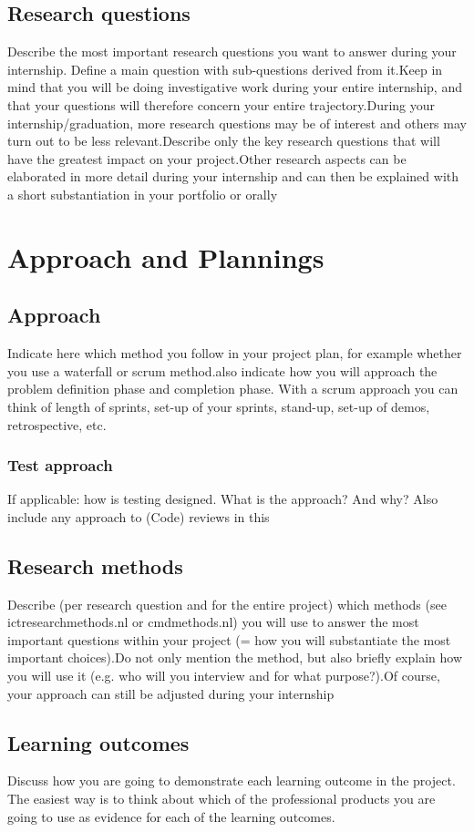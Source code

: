 \documentclass[a4paper, 11pt]{article}
\begin{document}
\subsection{Research questions}
Describe the most important research questions you want to answer during your internship. Define a main question with sub-questions derived from it.Keep in mind that you will be doing investigative work during your entire internship, and that your questions will therefore concern your entire trajectory.During your internship/graduation, more research questions may be of interest and others may turn out to be less relevant.Describe only the key research questions that will have the greatest impact on your project.Other research aspects can be elaborated in more detail during your internship and can then be explained with a short substantiation in your portfolio or orally
\section{Approach and Plannings}
\subsection{Approach}
Indicate here which method you follow in your project plan, for example whether you use a waterfall or scrum method.also indicate how you will approach the problem definition phase and completion phase. With a scrum approach you can think of length of sprints, set-up of your sprints, stand-up, set-up of demos, retrospective, etc.
\subsubsection{Test approach}
If applicable: how is testing designed. What is the approach? And why? Also include any approach to (Code) reviews in this
\subsection{Research methods}
Describe (per research question and for the entire project) which methods (see ictresearchmethods.nl or cmdmethods.nl) you will use to answer the most important questions within your project (= how you will substantiate the most important choices).Do not only mention the method, but also briefly explain how you will use it (e.g. who will you interview and for what purpose?).Of course, your approach can still be adjusted during your internship
\subsection{Learning outcomes}
Discuss how you are going to demonstrate each learning outcome in the project. The easiest way is to think about which of the professional products you are going to use as evidence for each of the learning outcomes.
\end{document}
